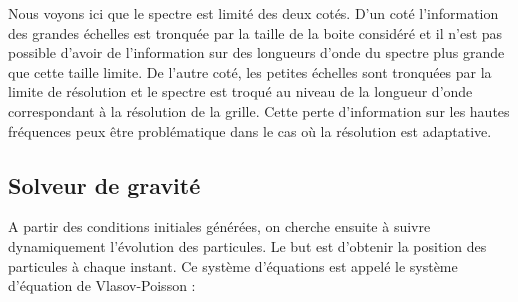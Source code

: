 Nous voyons ici que le spectre est limité des deux cotés.
D'un coté l'information des grandes échelles est tronquée par la taille de la boite considéré et il n'est pas possible d'avoir de l’information sur des longueurs d'onde du spectre plus grande que cette taille limite.
De l'autre coté, les petites échelles sont tronquées par la limite de résolution et le spectre est troqué au niveau de la longueur d'onde correspondant à la résolution de la grille.
Cette perte d'information sur les hautes fréquences peux être problématique dans le cas où la résolution est adaptative.




%
%

%
%

\subsection{Solveur de gravité}
\label{sec:gravity}


A partir des conditions initiales générées, on cherche ensuite à suivre dynamiquement l'évolution des particules.
Le but est d'obtenir la position des particules à chaque instant.
Ce système d'équations est appelé le système d'équation de Vlasov-Poisson :

